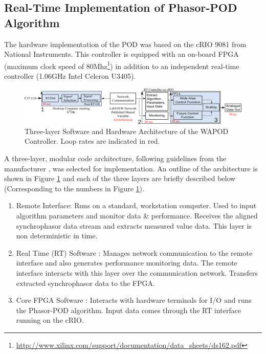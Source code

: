 \documentclass[journal]{IEEEtran}
\begin{document}
\subsection{Real-Time Implementation of Phasor-POD Algorithm}


The hardware implementation of the POD was based on the cRIO 9081 \cite{cRIO9081} from National Instruments. This controller is equipped with an on-board FPGA (maximum clock speed of 80Mhz\footnote{\url{http://www.xilinx.com/support/documentation/data_sheets/ds162.pdf}}) in addition to an independent real-time controller (1.06GHz Intel Celeron U3405). 
\begin{figure}[thbp]
\centering
\includegraphics[width=5in]{Final_RT_Arch.png} 
\caption{Three-layer Software and Hardware Architecture of the WAPOD Controller. Loop rates are indicated in red.} %
\label{RTArchitecture}
\vspace{-1em}
\end{figure}

A three-layer, modular code architecture\cite{Rebello_WAPOD_Software}, following guidelines from the manufacturer \cite{LabviewTemplate}, was selected for implementation. An outline of the architecture is shown in Figure \ref{RTArchitecture} and each of the three layers are briefly described below (Corresponding to the numbers in Figure \ref{RTArchitecture}). 

\begin{enumerate}
\item Remote Interface: Runs on a standard, workstation computer. Used to input algorithm parameters and monitor data \& performance. Receives the aligned synchrophasor data stream and extracts measured value data. This  layer is non deterministic in time.

\item Real Time (RT) Software : Manages network communication to the remote interface and also generates performance monitoring data. The remote interface interacts with this layer over the communication network. Transfers extracted synchrophasor data to the FPGA.

\item Core FPGA Software : Interacts with hardware terminals for I/O and runs the Phasor-POD algorithm. Input data comes through the RT interface running on the cRIO.

\end{enumerate}
\end{document}

